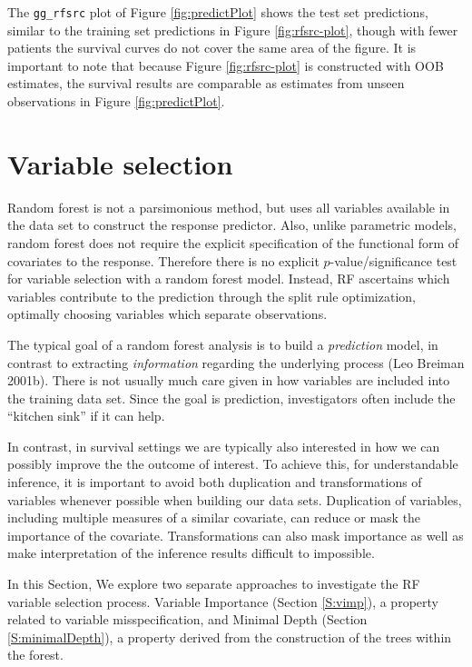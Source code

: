 \documentclass[article]{jss}
\begin{document}
The \texttt{gg\_rfsrc} plot of Figure \ref{fig:predictPlot} shows the
test set predictions, similar to the training set predictions in Figure
\ref{fig:rfsrc-plot}, though with fewer patients the survival curves do
not cover the same area of the figure. It is important to note that
because Figure \ref{fig:rfsrc-plot} is constructed with OOB estimates,
the survival results are comparable as estimates from unseen
observations in Figure \ref{fig:predictPlot}.

\section{Variable selection}\label{variable-selection}

Random forest is not a parsimonious method, but uses all variables
available in the data set to construct the response predictor. Also,
unlike parametric models, random forest does not require the explicit
specification of the functional form of covariates to the response.
Therefore there is no explicit \(p\)-value/significance test for
variable selection with a random forest model. Instead, RF ascertains
which variables contribute to the prediction through the split rule
optimization, optimally choosing variables which separate observations.

The typical goal of a random forest analysis is to build a
\emph{prediction} model, in contrast to extracting \emph{information}
regarding the underlying process (Leo Breiman 2001b). There is not
usually much care given in how variables are included into the training
data set. Since the goal is prediction, investigators often include the
``kitchen sink'' if it can help.

In contrast, in survival settings we are typically also interested in
how we can possibly improve the the outcome of interest. To achieve
this, for understandable inference, it is important to avoid both
duplication and transformations of variables whenever possible when
building our data sets. Duplication of variables, including multiple
measures of a similar covariate, can reduce or mask the importance of
the covariate. Transformations can also mask importance as well as make
interpretation of the inference results difficult to impossible.

In this Section, We explore two separate approaches to investigate the
RF variable selection process. Variable Importance (Section
\ref{S:vimp}), a property related to variable misspecification, and
Minimal Depth (Section \ref{S:minimalDepth}), a property derived from
the construction of the trees within the forest.
\end{document}
